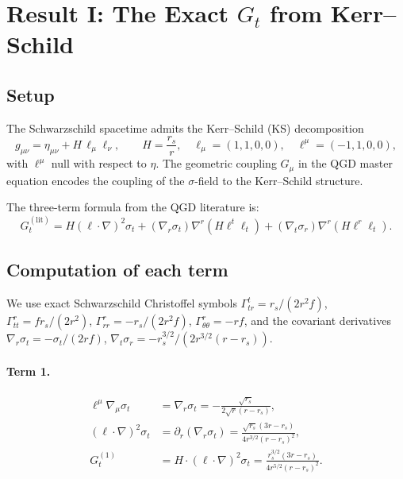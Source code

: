 \documentclass[11pt,a4paper]{article}
\theoremstyle{plain}
\theoremstyle{definition}
\theoremstyle{remark}
\newcommand{\sigt}{\sigma_t}
\newcommand{\rs}{r_s}
\begin{document}
\section{Result I: The Exact $G_t$ from Kerr--Schild}
\label{sec:Gt}

\subsection{Setup}

The Schwarzschild spacetime admits the Kerr--Schild (KS) decomposition
\begin{equation}
  g_{\mu\nu} = \eta_{\mu\nu} + H\,\ell_\mu\ell_\nu, \qquad
  H = \frac{\rs}{r}, \quad
  \ell_\mu = (1,1,0,0), \quad
  \ell^\mu = (-1,1,0,0),
\end{equation}
with $\ell^\mu$ null with respect to $\eta$.  The geometric coupling $G_\mu$
in the QGD master equation encodes the coupling of the $\sigma$-field to
the Kerr--Schild structure.

The three-term formula from the QGD literature is:
\begin{equation}\label{eq:Gt_formula}
  G_t^{(\mathrm{lit})} = H(\ell\cdot\nabla)^2\sigt
  + (\nabla_r\sigt)\nabla^r(H\ell^t\ell_t)
  + (\nabla_t\sigma_r)\nabla^r(H\ell^r\ell_t).
\end{equation}

\subsection{Computation of each term}

We use exact Schwarzschild Christoffel symbols
$\Gamma^t_{tr} = \rs/(2r^2f)$,
$\Gamma^r_{tt} = f\rs/(2r^2)$,
$\Gamma^r_{rr} = -\rs/(2r^2f)$,
$\Gamma^r_{\theta\theta} = -rf$,
and the covariant derivatives
$\nabla_r\sigt = -\sigt/(2rf)$,
$\nabla_t\sigma_r = -\rs^{3/2}/(2r^{3/2}(r-\rs))$.

\paragraph{Term 1.}
\begin{align}
  \ell^\mu\nabla_\mu\sigt &= \nabla_r\sigt
  = -\frac{\sqrt{\rs}}{2\sqrt{r}(r-\rs)}, \\
  (\ell\cdot\nabla)^2\sigt &= \partial_r(\nabla_r\sigt)
  = \frac{\sqrt{\rs}(3r-\rs)}{4r^{3/2}(r-\rs)^2}, \\
  G_t^{(1)} &= H\cdot(\ell\cdot\nabla)^2\sigt
  = \frac{\rs^{3/2}(3r-\rs)}{4r^{5/2}(r-\rs)^2}.
\end{align}
\end{document}
